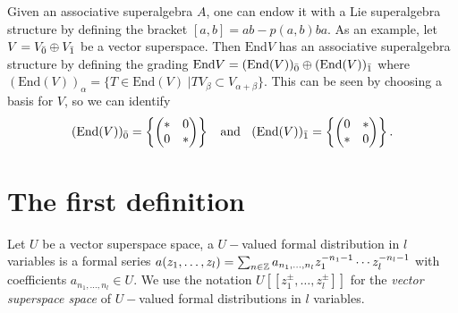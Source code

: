 Given an associative superalgebra $A$, one can endow it with a Lie superalgebra structure by defining the bracket $[a,b]=ab-p(a,b)ba$. As an example, let $V=V_{\Bar{0}}\oplus V_{\Bar{1}}$ be a vector superspace. Then $\text{End}V$ has an associative superalgebra structure by defining the grading $\text{End}V=(\text{End}(V))_{\Bar{0}}\oplus(\text{End}(V))_{\Bar{1}}$ where $(\text{End}(V))_{\alpha}=\{T\in \text{End}(V)\;| TV_{\beta}\subset V_{\alpha+\beta}\}$. This can be seen by choosing a basis for $V$, so we can identify 
\begin{equation}
    (\text{End}(V))_{\Bar{0}}=\left\{
    \begin{pmatrix}
        *&0\\0&*
    \end{pmatrix}\right\}\;\; \text{ and }\;\;
     (\text{End}(V))_{\Bar{1}}=\left\{
    \begin{pmatrix}
        0&*\\ *&0
    \end{pmatrix}\right\}.
\end{equation}


\section{The first definition}
\begin{dang}
    \begin{definition}
        Let $U$ be a vector superspace space, a $U-$valued formal distribution in $l$ variables is a formal series $a(z_1,\dots,z_l)=\sum_{n\in\mathbb{Z}}a_{n_1,\dots,n_l}z_1^{-n_1-1}\cdots z_l^{-n_l-1}$ with coefficients $a_{n_1,\dots,n_l}\in U$. We use the notation $U[[z_1^{\pm},\dots,z_l^{\pm}]]$ for the \textit{vector superspace space} of $U-$valued formal distributions in $l$ variables.
    \end{definition}
\end{dang}

